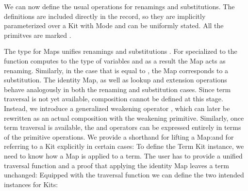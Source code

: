 \documentclass[screen,nonacm]{acmart}
\begin{document}
We can now define the usual operations for renamings and substitutions. The
definitions are included directly in the  record, so they are
implicitly parameterized over a Kit  with Mode  and
can be uniformly stated. All the primitves are marked .

\begin{minipage}[t]{0.48\linewidth}
      \raggedright{}
      \AMapA{}
\end{minipage}
\begin{minipage}[t]{0.48\linewidth}
      \raggedright{}
      \AMapB{}
\end{minipage}

\noindent The type for Maps    unifies renamings 
  and substitutions   . For  specialized to  the  function computes to
the type of variables and as a result the Map acts as renaming. Similarly, in the case
that  is equal to , the Map corresponds to a
substitution. The identity Map, as well as lookup and extension operations behave
analogously in both the renaming and substitution cases. Since term traversal
is not yet available, composition cannot be defined at this stage. Instead, we
introduce a generalized weakening operator , which can
later be rewritten as an actual composition with the weakening primitive. Similarly, once term
traversal is available, the  and 
operators can be expressed entirely in terms of the primitive operations.
We provide a shorthand for lifting a Map:\ALifting{}and for referring to a
Kit explicitly in certain cases: \AKitExplicit{}To define the Term Kit instance,
we need to know how a Map is applied to a term. The
user has to provide a unified traversal function and a proof that
applying the identity Map leaves a term unchanged: \ATraversal{}Equipped with the traversal function we can define the two intended instances
for Kits:

\noindent\begin{minipage}[t]{0.48\linewidth}
      \raggedright{}
      \AInstanceRen{}
\end{minipage}
\begin{minipage}[t]{0.48\linewidth}
      \raggedright{}
      \AInstanceSub{}
\end{minipage}
\end{document}
